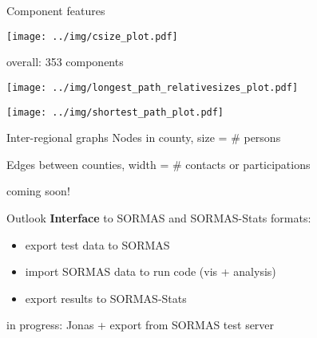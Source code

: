 \documentclass[
  8pt,
  ignorenonframetext,
]{beamer}
\providecommand{\tightlist}{%
  \setlength{\itemsep}{0pt}\setlength{\parskip}{0pt}}
\begin{document}
\begin{frame}{Component features}
\protect\hypertarget{component-features}{}
\begin{center}
\texttt{[image: ../img/csize\_plot.pdf]}
\end{center}

\tiny

overall: 353 components \normalsize
\end{frame}

\begin{frame}
\begin{center}
\texttt{[image: ../img/longest\_path\_relativesizes\_plot.pdf]}
\end{center}
\end{frame}

\begin{frame}
\begin{center}
\texttt{[image: ../img/shortest\_path\_plot.pdf]}
\end{center}
\end{frame}

\begin{frame}{Inter-regional graphs}
\protect\hypertarget{inter-regional-graphs}{}
Nodes in county, size = \# persons

Edges between counties, width = \# contacts or participations

\vspace{1cm}

\begin{center}
coming soon!
\end{center}
\end{frame}

\begin{frame}{Outlook}
\protect\hypertarget{outlook}{}
\textbf{Interface} to SORMAS and SORMAS-Stats formats:

\begin{itemize}
\tightlist
\item
  export test data to SORMAS
\item
  import SORMAS data to run code (vis + analysis)
\item
  export results to SORMAS-Stats
\end{itemize}

\vspace{1cm}

in progress: Jonas + export from SORMAS test server
\end{frame}
\end{document}
